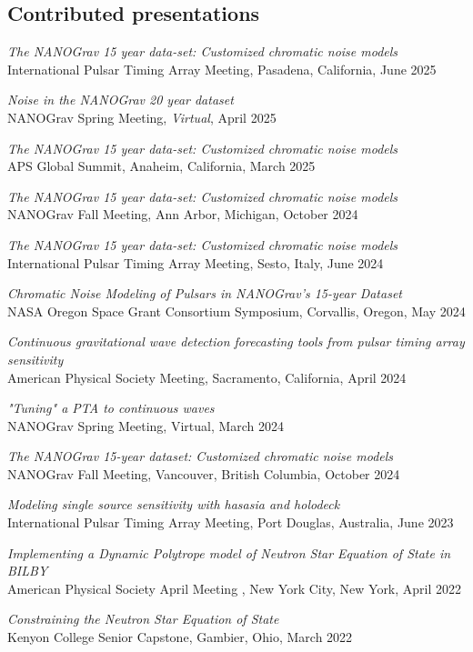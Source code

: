 \documentclass[11pt,letterpaper,sans,unicode]{moderncv}
\newcommand{\talkitem}[3]{\item \textit{#1}\\{#2}, #3} %
\begin{document}
{%
\subsection{Contributed presentations}
\renewcommand\labelenumi{\bfseries\theenumi .}
\begin{etaremune}[leftmargin=8mm]
\small
\talkitem{The NANOGrav 15 year data-set: Customized chromatic noise models}{International Pulsar Timing Array Meeting}{Pasadena, California, June 2025}
\talkitem{Noise in the NANOGrav 20 year dataset}{NANOGrav Spring Meeting}{\textit{Virtual}, April 2025}
\talkitem{The NANOGrav 15 year data-set: Customized chromatic noise models}{APS Global Summit}{Anaheim, California, March 2025}
\talkitem{The NANOGrav 15 year data-set: Customized chromatic noise models}{NANOGrav Fall Meeting}{Ann Arbor, Michigan, October 2024}
\talkitem{The NANOGrav 15 year data-set: Customized chromatic noise models}{International Pulsar Timing Array Meeting}{Sesto, Italy, June 2024}
\talkitem{Chromatic Noise Modeling of Pulsars in NANOGrav's 15-year Dataset}{NASA Oregon Space Grant Consortium Symposium}{Corvallis, Oregon, May 2024}
\talkitem{Continuous gravitational wave detection forecasting tools from pulsar timing array sensitivity}{American Physical Society Meeting}{Sacramento, California, April 2024}
\talkitem{"Tuning" a PTA to continuous waves}{NANOGrav Spring Meeting}{Virtual, March 2024}
\talkitem{The NANOGrav 15-year dataset: Customized chromatic noise models}{NANOGrav Fall Meeting}{Vancouver, British Columbia, October 2024}
\talkitem{Modeling single source sensitivity with hasasia and holodeck}{International Pulsar Timing Array Meeting}{Port Douglas, Australia, June 2023}
\talkitem{Implementing a Dynamic Polytrope model of Neutron Star Equation of State in BILBY}{American Physical Society April Meeting }{New York City, New York, April 2022}
\talkitem{Constraining the Neutron Star Equation of State}{Kenyon College Senior Capstone}{Gambier, Ohio, March 2022}



\end{etaremune}
}
\end{document}
